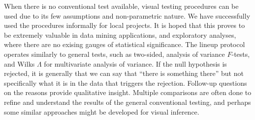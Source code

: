 \documentclass{article}
\newcommand{\blue}[1]{{\color{blue} #1}} %
\newcommand{\green}[1]{{\color{green} #1}} %
\begin{document}
When there is no conventional test available, visual testing procedures can be used due to its few assumptions and non-parametric nature. We have successfully used the procedures informally for local projects. It is hoped that this proves to be extremely valuable in data mining applications, and exploratory analyses, where there are no exising gauges of statistical significance. The lineup protocol operates similarly to general tests, such as two-sided, analysis of variance $F$-tests, and Wilks $\Lambda$ for multivariate analysis of variance. If the null hypothesis is rejected, it is generally that we can say that ``there is something there'' but not specifically what it is in the data that triggers the rejection. Follow-up questions on the reasons provide qualitative insight. Multiple comparisons are often done to refine and understand the results of the general conventional testing, and perhaps some similar approaches might be developed for visual inference. 




\end{document}
